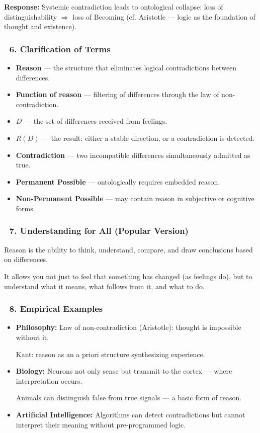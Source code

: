 \documentclass[12pt]{article}
\begin{document}
\textbf{Response:}
Systemic contradiction leads to ontological collapse: loss of distinguishability $\Rightarrow$ loss of Becoming (cf. Aristotle — logic as the foundation of thought and existence).

\subsubsection*{🔹 6. Clarification of Terms}
\begin{itemize}
\item \textbf{Reason} — the structure that eliminates logical contradictions between differences.
\item \textbf{Function of reason} — filtering of differences through the law of non-contradiction.
\item $D$ — the set of differences received from feelings.
\item $R(D)$ — the result: either a stable direction, or a contradiction is detected.
\item \textbf{Contradiction} — two incompatible differences simultaneously admitted as true.
\item \textbf{Permanent Possible} — ontologically requires embedded reason.
\item \textbf{Non-Permanent Possible} — may contain reason in subjective or cognitive forms.
\end{itemize}

\subsubsection*{🔹 7. Understanding for All (Popular Version)}
Reason is the ability to think, understand, compare, and draw conclusions based on differences.

It allows you not just to feel that something has changed (as feelings do), but to understand what it means, what follows from it, and what to do.

\subsubsection*{🔹 8. Empirical Examples}
\begin{itemize}
\item \textbf{Philosophy:}
Law of non-contradiction (Aristotle): thought is impossible without it.

Kant: reason as an a priori structure synthesizing experience.

\item \textbf{Biology:}
Neurons not only sense but transmit to the cortex — where interpretation occurs.

Animals can distinguish false from true signals — a basic form of reason.

\item \textbf{Artificial Intelligence:}
Algorithms can detect contradictions but cannot interpret their meaning without pre-programmed logic.
\end{itemize}
\end{document}
